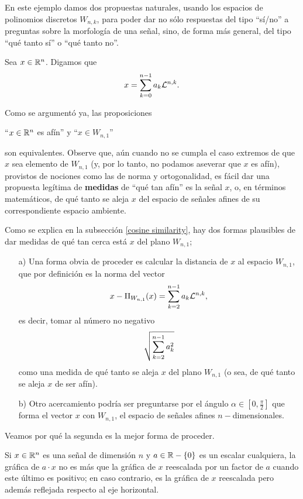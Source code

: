 \begin{ejemplo}
\label{subs: ejm 3}

En este ejemplo 
damos dos propuestas naturales,
usando los espacios de polinomios discretos $W_{n,k}$,
para poder dar no sólo respuestas del tipo
``sí/no'' a preguntas sobre la morfología de una señal, sino,
de forma más general, del tipo ``qué tanto sí'' o
``qué tanto no''.




Sea $x \in \mathbb{R}^{n}$. Digamos que 
\[
x = \sum\limits_{k=0}^{n-1}a_{k} \mathcal{L}^{n, k}.
\]


Como se argumentó ya, las proposiciones
\begin{center}
``$x \in \mathbb{R}^{n}$ es afín'' \hspace{0.2cm} y \hspace{0.2cm} 
``$x \in W_{n,1}$''
\end{center} 
son equivalentes.
Observe que, aún cuando no se cumpla el caso
extremos de que $x$ sea elemento 
de $W_{n,1}$ (y, por lo tanto, no podamos aseverar que
$x$ es afín), provistos
de nociones como las de norma y ortogonalidad, es fácil dar 
una propuesta legítima de
\textbf{medidas} de ``qué tan afín'' es la señal $x$,
o, en términos matemáticos, de qué tanto se aleja
$x$ del espacio de señales afines de su correspondiente
espacio ambiente.

Como se explica en la subsección \ref{cosine similarity}, hay
dos formas plausibles de dar medidas de qué tan cerca está
$x$ del plano $W_{n,1}$;

\begin{itemize}
\item[a)] Una forma obvia de proceder es calcular
la distancia de $x$ al espacio $W_{n,1}$, que por definición es 
la norma
del vector 
\[
x - \Pi_{W_{n,1}}(x)= \sum\limits_{k=2}^{n-1}a_{k} \mathcal{L}^{n, k},
\]
es decir, tomar al número no negativo
\[
\sqrt{ \sum\limits_{k=2}^{n-1}a_{k}^{2}}
\]
como una medida de qué tanto se aleja $x$ del plano $W_{n,1}$
(o sea, de qué tanto se aleja $x$ de ser afín).

\item[b)] Otro acercamiento podría ser preguntarse por
el ángulo $\alpha \in [0, \frac{\pi}{2}]$ 
que forma el vector $x$ con
$W_{n,1}$, el espacio de señales afines $n-$dimensionales.
\end{itemize}
Veamos por qué la segunda
es la mejor forma de proceder.

Si $x \in \mathbb{R}^{n}$ es una señal de dimensión $n$ y 
$a \in \mathbb{R}-\{ 0 \}$ es un escalar cualquiera,
la gráfica de $a \cdot x$ no es más que la gráfica 
de $x$ reescalada por un factor de $a$ cuando este
último es positivo; en caso contrario, es la gráfica
de $x$ reescalada pero además reflejada respecto al eje
horizontal.


\end{ejemplo}
